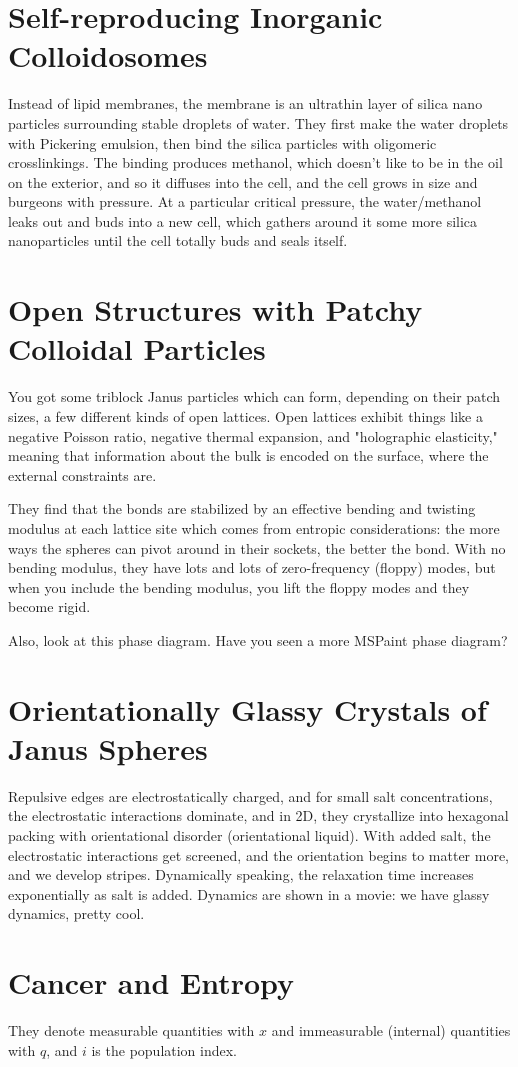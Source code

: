 \documentclass[11pt]{amsart}
\begin{document}
\section{Self-reproducing Inorganic Colloidosomes}
Instead of lipid membranes, the membrane is an ultrathin layer of silica nano particles surrounding stable droplets of water. They first make the water droplets with Pickering emulsion, then bind the silica particles with oligomeric crosslinkings. The binding produces methanol, which doesn't like to be in the oil on the exterior, and so it diffuses into the cell, and the cell grows in size and burgeons with pressure. At a particular critical pressure, the water/methanol leaks out and buds into a new cell, which gathers around it some more silica nanoparticles until the cell totally buds and seals itself.

\section{Open Structures with Patchy Colloidal Particles}
You got some triblock Janus particles which can form, depending on their patch sizes, a few different kinds of open lattices. Open lattices exhibit things like a negative Poisson ratio, negative thermal expansion, and "holographic elasticity," meaning that information about the bulk is encoded on the surface, where the external constraints are.

They find that the bonds are stabilized by an effective bending and twisting modulus at each lattice site which comes from entropic considerations: the more ways the spheres can pivot around in their sockets, the better the bond. With no bending modulus, they have lots and lots of zero-frequency (floppy) modes, but when you include the bending modulus, you lift the floppy modes and they become rigid.

Also, look at this phase diagram. Have you seen a more MSPaint phase diagram?

\section{Orientationally Glassy Crystals of Janus Spheres}
Repulsive edges are electrostatically charged, and for small salt concentrations, the electrostatic interactions dominate, and in 2D, they crystallize into hexagonal packing with orientational disorder (orientational liquid). With added salt, the electrostatic interactions get screened, and the orientation begins to matter more, and we develop stripes. Dynamically speaking, the relaxation time increases exponentially as salt is added. Dynamics are shown in a movie: we have glassy dynamics, pretty cool.

\section{Cancer and Entropy}
They denote measurable quantities with $x$ and immeasurable (internal) quantities with $q$, and $i$ is the population index.
\end{document}

